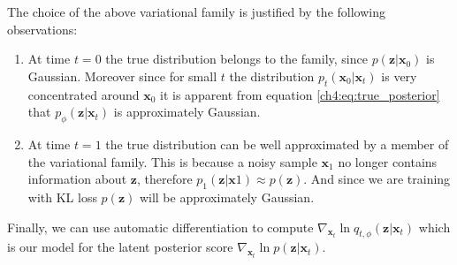 The choice of the above variational family is justified by the following observations:
\begin{enumerate}
    \item At time $t=0$ the true distribution belongs to the family, since  $p(\textbf{z} | \textbf{x}_0)$ is Gaussian. Moreover since for small $t$ the distribution $p_t(\textbf{x}_0 | \textbf{x}_t)$ is very concentrated around $\textbf{x}_0$ it is apparent from equation \ref{ch4:eq:true_posterior} that $p_\phi(\textbf{z} | \textbf{x}_t)$ is approximately Gaussian. 
    \item At time $t=1$ the true distribution can be well approximated by a member of the variational family. This is because a noisy sample $\textbf{x}_1$ no longer contains information about $\textbf{z}$, therefore $ p_1(\textbf{z} | \textbf{x}1) \approx p(\textbf{z})$. And since we are training with KL loss $ p(\textbf{z})$ will be approximately Gaussian. 
\end{enumerate}

Finally, we can use automatic differentiation to compute $\nabla_{\textbf{x}_t} \ln q_{t, \phi}(\textbf{z} | \textbf{x}_t)  $ which is our model for the latent posterior score $\nabla_{\textbf{x}_t}  \ln{p(\textbf{z} | \textbf{x}_t )}$.

